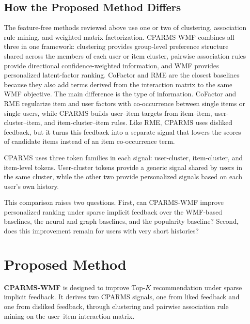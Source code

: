 \documentclass[pdflatex,sn-vancouver-num]{sn-jnl}%
\theoremstyle{thmstyleone}%
\theoremstyle{thmstyletwo}%
\theoremstyle{thmstylethree}%
\begin{document}
\subsection{How the Proposed Method Differs}

The feature-free methods reviewed above use one or two of clustering, association rule mining, and weighted matrix factorization. CPARMS-WMF combines all three in one framework: clustering provides group-level preference structure shared across the members of each user or item cluster, pairwise association rules provide directional confidence-weighted information, and WMF provides personalized latent-factor ranking. CoFactor and RME are the closest baselines because they also add terms derived from the interaction matrix to the same WMF objective. The main difference is the type of information. CoFactor and RME regularize item and user factors with co-occurrence between single items or single users, while CPARMS builds user--item targets from item--item, user-cluster--item, and item-cluster--item rules. Like RME, CPARMS uses disliked feedback, but it turns this feedback into a separate signal that lowers the scores of candidate items instead of an item co-occurrence term.

CPARMS uses three token families in each signal: user-cluster, item-cluster, and item-level tokens. User-cluster tokens provide a generic signal shared by users in the same cluster, while the other two provide personalized signals based on each user's own history.

This comparison raises two questions. First, can CPARMS-WMF improve personalized ranking under sparse implicit feedback over the WMF-based baselines, the neural and graph baselines, and the popularity baseline? Second, does this improvement remain for users with very short histories?



\section{Proposed Method}\label{sec3}

\textbf{CPARMS-WMF} is designed to improve Top-$K$ recommendation under sparse implicit feedback. It derives two CPARMS signals, one from liked feedback and one from disliked feedback, through clustering and pairwise association rule mining on the user--item interaction matrix.
\end{document}
